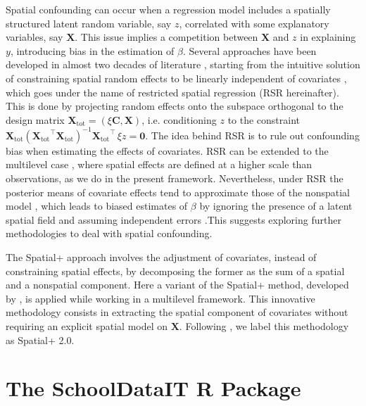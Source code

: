 \documentclass[openany]{book}
\begin{document}
Spatial confounding can occur when a regression model includes a spatially structured latent random variable, say $z$, correlated with some explanatory variables, say $\mathbf{X}$. This issue implies a competition between $\mathbf{X}$ and $z$ in explaining $y$, introducing bias in the estimation of $\beta$. Several approaches have been developed in almost two decades of literature \citep{Urdangarin23, DupontArXiv}, starting from the intuitive solution of constraining spatial random effects to be linearly independent of covariates \citep{RHZ, Hodges}, which goes under the name of restricted spatial regression (RSR hereinafter). This is done by projecting random effects onto the subspace orthogonal to the design matrix $\mathbf{X_\mathrm{tot}} = (\xi\mathbf{C}, \mathbf{X})$, i.e. conditioning $z$ to the constraint $\mathbf{X_\mathrm{tot}}(\mathbf{X_\mathrm{tot}}^{\top}\mathbf{X_\mathrm{tot}})^{-1}\mathbf{X_\mathrm{tot}}^{\top} \, \xi z = \mathbf{0}$. The idea behind RSR is to rule out confounding bias when estimating the effects of covariates. RSR can be extended to the multilevel case \citep{Nobre}, where spatial effects are defined at a higher scale than observations, as we do in the present framework. Nevertheless, under RSR the posterior means of covariate effects tend to approximate those of the nonspatial model \citep{Khan}, which leads to biased estimates of $\beta$ by ignoring the presence of a latent spatial field and assuming independent errors \citep{DupontArXiv}.This suggests exploring further methodologies to deal with spatial confounding.

The Spatial+ approach \citep{Dupont} involves the adjustment of covariates, instead of constraining spatial effects, by decomposing the former as the sum of a spatial and a nonspatial component. Here a variant of the Spatial+ method, developed by \cite{Urdangarin24}, is applied while working in a multilevel framework. This innovative methodology consists in extracting the spatial component of covariates without requiring an explicit spatial model on $\mathbf{X}$. Following \cite{Lamouroux}, we label this methodology as Spatial+ 2.0. 



%
%

%
\chapter{The SchoolDataIT R Package} \label{chapter:SchoolDataIT}
\end{document}
